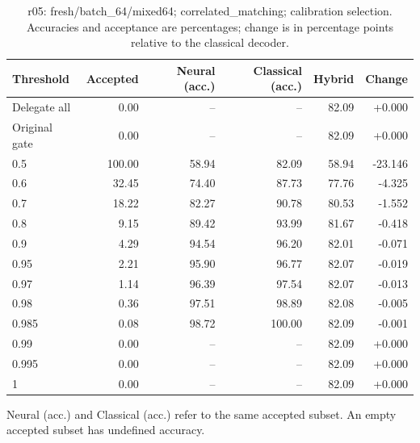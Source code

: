 \begin{table}[htbp]
\centering\small
\setlength{\tabcolsep}{3pt}
\caption{r05: fresh/batch\_64/mixed64; correlated\_matching; calibration selection. Accuracies and acceptance are percentages; change is in percentage points relative to the classical decoder.}
\begin{tabular}{lrrrrr}
\toprule
Threshold & Accepted & Neural (acc.) & Classical (acc.) & Hybrid & Change \\
\midrule
Delegate all & 0.00 & -- & -- & 82.09 & +0.000 \\
Original gate & 0.00 & -- & -- & 82.09 & +0.000 \\
0.5 & 100.00 & 58.94 & 82.09 & 58.94 & -23.146 \\
0.6 & 32.45 & 74.40 & 87.73 & 77.76 & -4.325 \\
0.7 & 18.22 & 82.27 & 90.78 & 80.53 & -1.552 \\
0.8 & 9.15 & 89.42 & 93.99 & 81.67 & -0.418 \\
0.9 & 4.29 & 94.54 & 96.20 & 82.01 & -0.071 \\
0.95 & 2.21 & 95.90 & 96.77 & 82.07 & -0.019 \\
0.97 & 1.14 & 96.39 & 97.54 & 82.07 & -0.013 \\
0.98 & 0.36 & 97.51 & 98.89 & 82.08 & -0.005 \\
0.985 & 0.08 & 98.72 & 100.00 & 82.09 & -0.001 \\
0.99 & 0.00 & -- & -- & 82.09 & +0.000 \\
0.995 & 0.00 & -- & -- & 82.09 & +0.000 \\
1 & 0.00 & -- & -- & 82.09 & +0.000 \\
\bottomrule
\end{tabular}
\par\smallskip\footnotesize Neural (acc.) and Classical (acc.) refer to the same accepted subset. An empty accepted subset has undefined accuracy.
\end{table}
